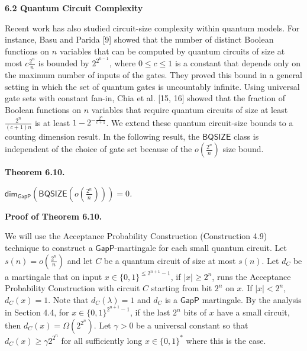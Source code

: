 \par\medskip\noindent\textbf{
6.2 Quantum Circuit Complexity}\par




Recent work has also studied circuit-size complexity within quantum models. For instance, Basu and Parida [9] showed that the number of distinct Boolean functions on $n$ variables that can be computed by quantum circuits of size at most $c\frac{2^{n}}{n}$ is bounded by $2^{2^{n-1}}$, where $0\leq c\leq 1$ is a constant that depends only on the maximum number of inputs of the gates. They proved this bound in a general setting in which the set of quantum gates is uncountably infinite.
Using universal gate sets with constant fan-in, Chia et al. [15, 16] showed that the fraction of Boolean functions on $n$ variables that require quantum circuits of size at least $\frac{2^{n}}{(c+1)n}$ is at least $1-2^{-\frac{2^{n}}{c+1}}$.
We extend these quantum circuit-size bounds to a counting dimension result. In the following result, the $\mathsf{BQSIZE}$ class is independent of the choice of gate set because of the $o\left(\frac{2^{n}}{n}\right)$ size bound.\par





\par\medskip\noindent\textbf{
\textbf{Theorem 6.10}\textbf{.}
}\par



${\mathsf{dim}}_{\mathsf{GapP}}\left(\mathsf{BQSIZE}\left(o\left(\frac{2^{n}}{n}\right)\right)\right)=0$\emph{.}\par






\par\medskip\noindent\textbf{Proof of Theorem 6.10.}\par




We will use the Acceptance Probability Construction (Construction 4.9) technique to construct a $\mathsf{GapP}$-martingale for each small quantum circuit.
Let $s(n)=o(\frac{2^{n}}{n})$ and let $C$ be a quantum circuit of size at most $s(n)$.
Let $d_{C}$ be a martingale that on input $x\in\{0,1\}^{\leq 2^{n+1}-1}$, if $|x|\geq 2^{n}$,
runs the Acceptance Probability Construction with circuit $C$ starting from bit $2^{n}$ on $x$. If $|x|<2^{n}$, $d_{C}(x)=1$.
Note that $d_{C}(\lambda)=1$ and $d_{C}$ is a $\mathsf{GapP}$ martingale. By the analysis in Section 4.4, for $x\in\{0,1\}^{2^{n+1}-1}$, if the last $2^{n}$ bits of $x$ have a small circuit, then $d_{C}(x)=\Omega(2^{2^{n}})$.
Let $\gamma>0$ be a universal constant so that $d_{C}(x)\geq\gamma 2^{2^{n}}$ for all sufficiently long $x\in\{0,1\}^{*}$ where this is the case.\par




